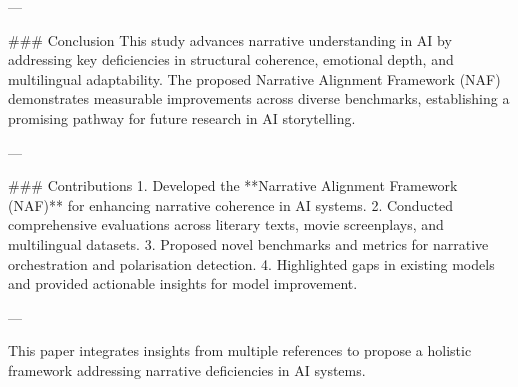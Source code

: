 ---

### Conclusion  
This study advances narrative understanding in AI by addressing key deficiencies in structural coherence, emotional depth, and multilingual adaptability. The proposed Narrative Alignment Framework (NAF) demonstrates measurable improvements across diverse benchmarks, establishing a promising pathway for future research in AI storytelling.

---

### Contributions  
1. Developed the **Narrative Alignment Framework (NAF)** for enhancing narrative coherence in AI systems.  
2. Conducted comprehensive evaluations across literary texts, movie screenplays, and multilingual datasets.  
3. Proposed novel benchmarks and metrics for narrative orchestration and polarisation detection.  
4. Highlighted gaps in existing models and provided actionable insights for model improvement.  

--- 

This paper integrates insights from multiple references to propose a holistic framework addressing narrative deficiencies in AI systems.